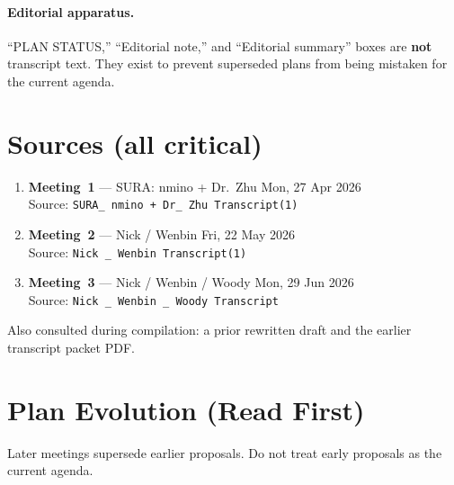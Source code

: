 \documentclass[11pt]{article}
\begin{document}
\paragraph{Editorial apparatus.}
``PLAN STATUS,'' ``Editorial note,'' and ``Editorial summary'' boxes are
\textbf{not} transcript text. They exist to prevent superseded plans from being
mistaken for the current agenda.

\section*{Sources (all critical)}
\begin{enumerate}[leftmargin=*,itemsep=0.35em]
  \item \textbf{Meeting~1} --- SURA: nmino + Dr.~Zhu \quad Mon, 27 Apr 2026\\
        Source: \texttt{SURA\_ nmino + Dr\_ Zhu Transcript(1)}
  \item \textbf{Meeting~2} --- Nick / Wenbin \quad Fri, 22 May 2026\\
        Source: \texttt{Nick \_ Wenbin Transcript(1)}
  \item \textbf{Meeting~3} --- Nick / Wenbin / Woody \quad Mon, 29 Jun 2026\\
        Source: \texttt{Nick \_ Wenbin \_ Woody Transcript}
\end{enumerate}
Also consulted during compilation: a prior rewritten draft and the earlier
transcript packet PDF.

\section*{Plan Evolution (Read First)}
Later meetings supersede earlier proposals. Do not treat early proposals as the
current agenda.
\end{document}
